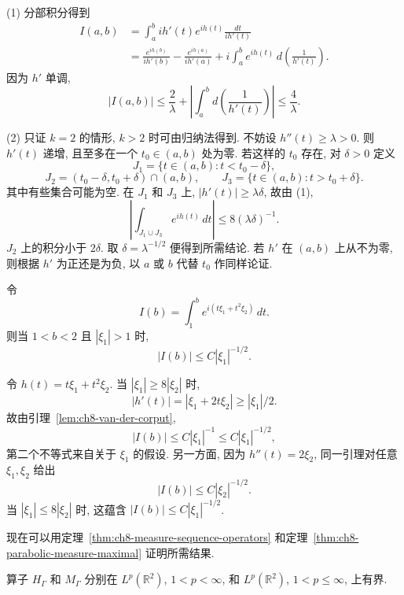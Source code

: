 \begin{Proof}
(1) 分部积分得到
\[
 \begin{aligned}
 I(a,b)
 &=\int_a^bih'(t)e^{ih(t)}\frac{dt}{ih'(t)}\\
 &=\frac{e^{ih(b)}}{ih'(b)}-\frac{e^{ih(a)}}{ih'(a)}
 +i\int_a^be^{ih(t)}\,d\left(\frac1{h'(t)}\right).
 \end{aligned}
\]
因为 $h'$ 单调,
\[
 |I(a,b)|\le\frac2\lambda
 +\left|\int_a^b d\left(\frac1{h'(t)}\right)\right|
 \le\frac4\lambda.
\]

(2) 只证 $k=2$ 的情形, $k>2$ 时可由归纳法得到. 不妨设 $h''(t)\ge\lambda>0$. 则 $h'(t)$ 递增, 且至多在一个 $t_0\in(a,b)$ 处为零. 若这样的 $t_0$ 存在, 对 $\delta>0$ 定义
\[
 J_1=\{t\in(a,b):t<t_0-\delta\},
\]
\[
 J_2=(t_0-\delta,t_0+\delta)\cap(a,b),
 \qquad
 J_3=\{t\in(a,b):t>t_0+\delta\}.
\]
其中有些集合可能为空. 在 $J_1$ 和 $J_3$ 上, $|h'(t)|\ge\lambda\delta$, 故由 (1),
\[
 \left|\int_{J_1\cup J_3}e^{ih(t)}\,dt\right|
 \le8(\lambda\delta)^{-1}.
\]
$J_2$ 上的积分小于 $2\delta$. 取 $\delta=\lambda^{-1/2}$ 便得到所需结论. 若 $h'$ 在 $(a,b)$ 上从不为零, 则根据 $h'$ 为正还是为负, 以 $a$ 或 $b$ 代替 $t_0$ 作同样论证.
\end{Proof}

\begin{Lemma}
\label{lem:ch8-parabola-oscillatory-integral}
令
\[
 I(b)=\int_1^be^{i(t\xi_1+t^2\xi_2)}\,dt.
\]
则当 $1<b<2$ 且 $|\xi_1|>1$ 时,
\[
 |I(b)|\le C|\xi_1|^{-1/2}.
\]
\end{Lemma}

\hypertarget{chapter-08-page-196}{}
\begin{Proof}
令 $h(t)=t\xi_1+t^2\xi_2$. 当 $|\xi_1|\ge8|\xi_2|$ 时,
\[
 |h'(t)|=|\xi_1+2t\xi_2|\ge|\xi_1|/2.
\]
故由引理~\ref{lem:ch8-van-der-corput},
\[
 |I(b)|\le C|\xi_1|^{-1}\le C|\xi_1|^{-1/2},
\]
第二个不等式来自关于 $\xi_1$ 的假设. 另一方面, 因为 $h''(t)=2\xi_2$, 同一引理对任意 $\xi_1,\xi_2$ 给出
\[
 |I(b)|\le C|\xi_2|^{-1/2}.
\]
当 $|\xi_1|\le8|\xi_2|$ 时, 这蕴含 $|I(b)|\le C|\xi_1|^{-1/2}$.
\end{Proof}

现在可以用定理~\ref{thm:ch8-measure-sequence-operators} 和定理~\ref{thm:ch8-parabolic-measure-maximal} 证明所需结果.

\begin{Corollary}
\label{cor:ch8-parabola-hilbert-maximal}
算子 $H_\Gamma$ 和 $M_\Gamma$ 分别在 $L^p(\mathbb R^2)$, $1<p<\infty$, 和 $L^p(\mathbb R^2)$, $1<p\le\infty$, 上有界.
\end{Corollary}

